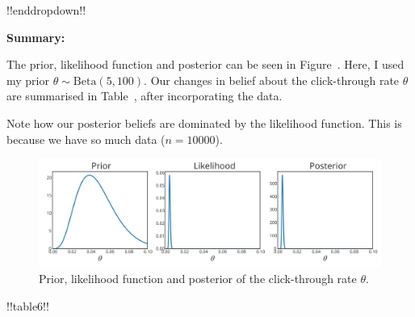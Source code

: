 {!!enddropdown!!

\textbf{Summary:} 

The prior, likelihood function and posterior can be seen in Figure~. Here, I used my prior $\theta \sim \mathrm{Beta}(5,100)$. Our changes in belief about the click-through rate $\theta$ are summarised in Table~, after incorporating the data.

Note how our posterior beliefs are dominated by the likelihood function. This is because we have so much data ($n = 10000$). 

\begin{figure}[h] 

\includegraphics{images/clickthroughrate_priorposterior.svg}
\caption{Prior, likelihood function and posterior of the click-through rate $\theta$.}

\label{fig:clickthrough}
\end{figure}}



!!table6!!

\clearpage

